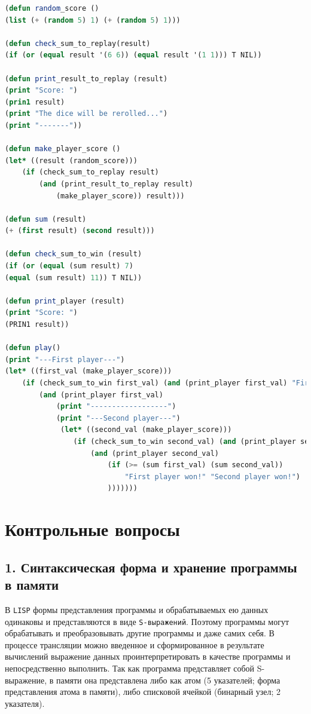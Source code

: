 \documentclass[12pt]{report}
\begin{document}
\begin{lstlisting}[label=9, language=lisp]
(defun random_score ()
(list (+ (random 5) 1) (+ (random 5) 1)))

(defun check_sum_to_replay(result)
(if (or (equal result '(6 6)) (equal result '(1 1))) T NIL))

(defun print_result_to_replay (result)
(print "Score: ") 
(prin1 result) 
(print "The dice will be rerolled...") 
(print "-------"))

(defun make_player_score ()
(let* ((result (random_score)))
    (if (check_sum_to_replay result) 
        (and (print_result_to_replay result) 
            (make_player_score)) result)))

(defun sum (result)
(+ (first result) (second result)))

(defun check_sum_to_win (result)
(if (or (equal (sum result) 7) 
(equal (sum result) 11)) T NIL))

(defun print_player (result)
(print "Score: ")
(PRIN1 result))

(defun play()
(print "---First player---")
(let* ((first_val (make_player_score)))
    (if (check_sum_to_win first_val) (and (print_player first_val) "First player won!") 
        (and (print_player first_val)
            (print "------------------")
            (print "---Second player---")
             (let* ((second_val (make_player_score)))
                (if (check_sum_to_win second_val) (and (print_player second_val) "Second player won!")
                    (and (print_player second_val) 
                        (if (>= (sum first_val) (sum second_val)) 
                            "First player won!" "Second player won!")
                        )))))))
					\end{lstlisting}



\section*{Контрольные вопросы}

\subsection*{1. Синтаксическая форма и хранение программы в памяти}

В \texttt{LISP} формы представления программы и обрабатываемых ею данных одинаковы и представляются в виде \texttt{S-выражений}. 
Поэтому программы могут обрабатывать и преобразовывать другие программы и даже самих себя. 
В процессе трансляции можно введенное и сформированное в результате вычислений выражение данных проинтерпретировать в качестве программы и непосредственно выполнить. 
Так как программа представляет собой S-выражение, в памяти она представлена либо как атом (5 указателей; форма представления атома в памяти), либо списковой ячейкой (бинарный узел; 2 указателя).
\end{document}
